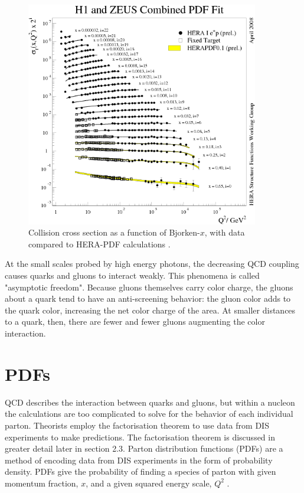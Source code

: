\begin{figure}[h!]
\begin{centering}
\includegraphics[width=4in]{Chapter1/importfigs/scholarpedia_bjorken_x_qcdExp.png}
\par\end{centering}
\caption{Collision cross section as a function of Bjorken-$x$, with data compared to HERA-PDF calculations \cite{Shimizu:2009fc}. \label{fig:qcdBjorkenX}}
\end{figure}

At the small scales probed by high energy photons, the decreasing QCD coupling causes quarks and gluons to interact weakly. This phenomena is called "asymptotic freedom". Because gluons themselves carry color charge, the gluons about a quark tend to have an anti-screening behavior: the gluon color adds to the quark color, increasing the net color charge of the area. At smaller distances to a quark, then, there are fewer and fewer gluons augmenting the color interaction.

\section{PDFs}

QCD describes the interaction between quarks and gluons, but within a nucleon the calculations are too complicated to solve for the behavior of each individual parton. Theorists employ the factorisation theorem to use data from DIS experiments to make predictions. The factorisation theorem is discussed in greater detail later in section 2.3. Parton distribution functions (PDFs) are a method of encoding data from DIS experiments in the form of probability density. PDFs give the probability of finding a species of parton with given momentum fraction, $x$, and a given squared energy scale, $Q^2$ \cite{Martin:2009iq,Eskola:2008ca,Pumplin:2002vw,cmsJpPP}.


